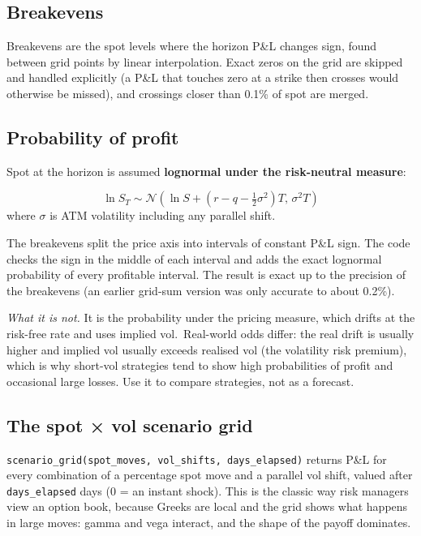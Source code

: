 \documentclass[10pt,a4paper]{article}
\numberwithin{equation}{section}
\begin{document}
\subsection{Breakevens}\label{breakevens}

Breakevens are the spot levels where the horizon P\&L changes sign, found between grid points by linear interpolation. Exact zeros on the grid are skipped and handled explicitly (a P\&L that touches zero at a strike then crosses would otherwise be missed), and crossings closer than 0.1\% of spot are merged.

\subsection{Probability of profit}\label{probability-of-profit}

Spot at the horizon is assumed \textbf{lognormal under the risk-neutral measure}:

\begin{equation}
\ln S_T\sim\mathcal{N}\!\left(\ln S+(r-q-\tfrac12\sigma^2)T,\,\sigma^2T\right)
\end{equation} where \(\sigma\) is ATM volatility including any parallel shift.

The breakevens split the price axis into intervals of constant P\&L sign. The code checks the sign in the middle of each interval and adds the exact lognormal probability of every profitable interval. The result is exact up to the precision of the breakevens (an earlier grid-sum version was only accurate to about 0.2\%).

\emph{What it is not.} It is the probability under the pricing measure, which drifts at the risk-free rate and uses implied vol.~Real-world odds differ: the real drift is usually higher and implied vol usually exceeds realised vol (the volatility risk premium), which is why short-vol strategies tend to show high probabilities of profit and occasional large losses. Use it to compare strategies, not as a forecast.

\subsection{The spot × vol scenario grid}\label{the-spot-vol-scenario-grid}

\texttt{scenario\_grid(spot\_moves,\ vol\_shifts,\ days\_elapsed)} returns P\&L for every combination of a percentage spot move and a parallel vol shift, valued after \texttt{days\_elapsed} days (0 = an instant shock). This is the classic way risk managers view an option book, because Greeks are local and the grid shows what happens in large moves: gamma and vega interact, and the shape of the payoff dominates.
\end{document}
